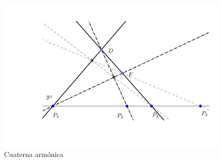 \begin{figure}[h]
	\centering
	\includegraphics[scale=.6]{Graficos/RazonDoble/razon_doble}
	\caption{Cuaterna armónica}
	\label{C5_img_cuaterna_armonica}
\end{figure}

